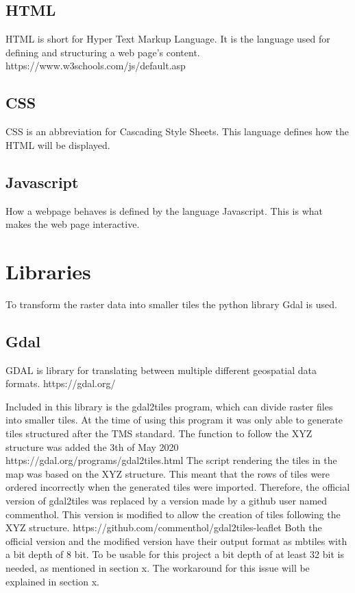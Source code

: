 \subsection*{HTML}
HTML is short for Hyper Text Markup Language. It is the language used for defining and structuring a web page’s content.
https://www.w3schools.com/js/default.asp
\subsection*{CSS}
CSS is an abbreviation for Cascading Style Sheets. This language defines how the HTML will be displayed.
\subsection*{Javascript}
How a webpage behaves is defined by the language Javascript.  This is what makes the web page interactive. 
\citep{CPL}

\section{Libraries}
To transform the raster data into smaller tiles the python library Gdal is used. 
\subsection*{Gdal}
GDAL is library for translating between multiple different geospatial data formats. https://gdal.org/ 

Included in this library is the gdal2tiles program, which can divide raster files into smaller tiles. 
At the time of using this program it was only able to generate tiles structured after the TMS standard. The function to follow the XYZ structure was added the 3th of May 2020 https://gdal.org/programs/gdal2tiles.html
The script rendering the tiles in the map was based on the XYZ structure. This meant that the rows of tiles were ordered incorrectly when the generated tiles were imported. Therefore, the official version of gdal2tiles was replaced by a version made by a github user named commenthol. This version is modified to allow the creation of tiles following the XYZ structure. 
https://github.com/commenthol/gdal2tiles-leaflet
Both the official version and the modified version have their output format as mbtiles with a bit depth of 8 bit. To be usable for this project a bit depth of at least 32 bit is needed, as mentioned in section x. The workaround for this issue will be explained in section x. 
